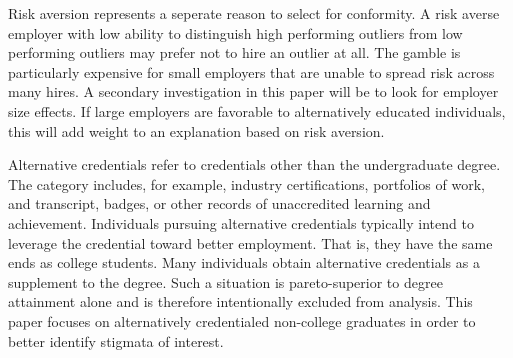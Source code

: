 \documentclass[review]{elsarticle}
\begin{document}
Risk aversion represents a seperate reason to select for conformity.
A risk averse employer with low ability to distinguish high performing outliers from low performing outliers may prefer not to hire an outlier at all.
The gamble is particularly expensive for small employers that are unable to spread risk across many hires.
A secondary investigation in this paper will be to look for employer size effects.
If large employers are favorable to alternatively educated individuals, this will add weight to an explanation based on risk aversion.



Alternative credentials refer to credentials other than the undergraduate degree\cite{brown2017complex}.
The category includes, for example,
industry certifications,
portfolios of work,
and transcript, badges, or other records of unaccredited learning and achievement.
Individuals pursuing alternative credentials typically intend to leverage the credential toward better employment.
That is, they have the same ends as college students.
Many individuals obtain alternative credentials as a supplement to the degree.
Such a situation is pareto-superior to degree attainment alone and is therefore intentionally excluded from analysis.
This paper focuses on alternatively credentialed non-college graduates in order to better identify stigmata of interest.
\end{document}
